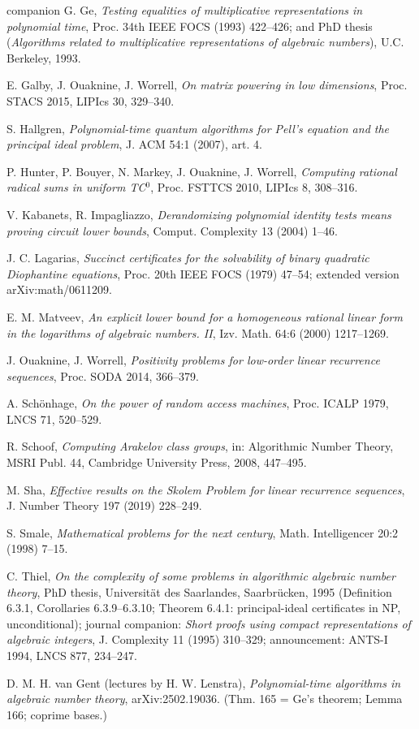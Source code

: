 \documentclass[11pt]{amsart}
\theoremstyle{plain}
\theoremstyle{remark}
\begin{document}
\begin{thebibliography}{companion}
 G. Ge, \emph{Testing equalities of
  multiplicative representations in polynomial time}, Proc. 34th IEEE
  FOCS (1993) 422--426; and PhD thesis (\emph{Algorithms related to
  multiplicative representations of algebraic numbers}),
  U.C. Berkeley, 1993.

 E. Galby, J. Ouaknine, J. Worrell, \emph{On
  matrix powering in low dimensions}, Proc. STACS 2015, LIPIcs 30,
  329--340.

 S. Hallgren, \emph{Polynomial-time quantum
  algorithms for Pell's equation and the principal ideal problem},
  J. ACM 54:1 (2007), art. 4.

 P. Hunter, P. Bouyer, N. Markey,
  J. Ouaknine, J. Worrell, \emph{Computing rational radical sums in
  uniform TC$^0$}, Proc. FSTTCS 2010, LIPIcs 8, 308--316.

 V. Kabanets, R. Impagliazzo, \emph{Derandomizing
  polynomial identity tests means proving circuit lower bounds},
  Comput. Complexity 13 (2004) 1--46.

 J. C. Lagarias, \emph{Succinct certificates
  for the solvability of binary quadratic Diophantine equations},
  Proc. 20th IEEE FOCS (1979) 47--54; extended version
  arXiv:math/0611209.

 E. M. Matveev, \emph{An explicit lower bound
  for a homogeneous rational linear form in the logarithms of
  algebraic numbers. II}, Izv. Math. 64:6 (2000) 1217--1269.

 J. Ouaknine, J. Worrell, \emph{Positivity
  problems for low-order linear recurrence sequences}, Proc. SODA
  2014, 366--379.

 A. Sch\"onhage, \emph{On the power of random
  access machines}, Proc. ICALP 1979, LNCS 71, 520--529.

 R. Schoof, \emph{Computing Arakelov class
  groups}, in: Algorithmic Number Theory, MSRI Publ. 44, Cambridge
  University Press, 2008, 447--495.

 M. Sha, \emph{Effective results on the Skolem
  Problem for linear recurrence sequences}, J. Number Theory 197
  (2019) 228--249.

 S. Smale, \emph{Mathematical problems for the
  next century}, Math. Intelligencer 20:2 (1998) 7--15.

 C. Thiel, \emph{On the complexity of some
  problems in algorithmic algebraic number theory}, PhD thesis,
  Universit\"at des Saarlandes, Saarbr\"ucken, 1995 (Definition
  6.3.1, Corollaries 6.3.9--6.3.10; Theorem 6.4.1: principal-ideal
  certificates in NP, unconditional); journal companion: \emph{Short
  proofs using compact representations of algebraic integers},
  J. Complexity 11 (1995) 310--329; announcement: ANTS-I 1994, LNCS
  877, 234--247.

 D. M. H. van Gent (lectures by
  H. W. Lenstra), \emph{Polynomial-time algorithms in algebraic
  number theory}, arXiv:2502.19036. (Thm. 165 = Ge's theorem; Lemma
  166; coprime bases.)

\end{thebibliography}
\end{document}
